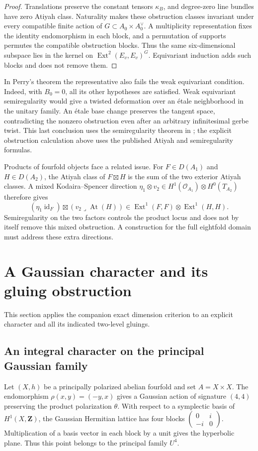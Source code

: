 \documentclass[11pt]{article}
\theoremstyle{definition}
\theoremstyle{remark}
\newcommand{\Z}{\mathbf Z}
\begin{document}
\begin{proof}
Translations preserve the constant tensors $\kappa_B$, and degree-zero line bundles have zero Atiyah class. Naturality makes these obstruction classes invariant under every compatible finite action of $G\subset A_0\times A_0^\vee$. A multiplicity representation fixes the identity endomorphism in each block, and a permutation of supports permutes the compatible obstruction blocks. Thus the same six-dimensional subspace lies in the kernel on $\operatorname{Ext}^2(E_v,E_v)^G$. Equivariant induction adds such blocks and does not remove them.
\end{proof}

In Perry's theorem the representative also fails the weak equivariant condition. Indeed, with $B_0=0$, all its other hypotheses are satisfied. Weak equivariant semiregularity would give a twisted deformation over an \'etale neighborhood in the unitary family. An \'etale base change preserves the tangent space, contradicting the nonzero obstruction even after an arbitrary infinitesimal gerbe twist. This last conclusion uses the semiregularity theorem in \cite{Perry}; the explicit obstruction calculation above uses the published Atiyah and semiregularity formulas.

Products of fourfold objects face a related issue. For $F\in D(A_1)$ and $H\in D(A_2)$, the Atiyah class of $F\boxtimes H$ is the sum of the two exterior Atiyah classes. A mixed Kodaira--Spencer direction $\eta_1\otimes v_2\in H^1(\mathcal O_{A_1})\otimes H^0(T_{A_2})$ therefore gives
\[
 (\eta_1\operatorname{id}_F)\boxtimes
 (v_2\mathbin{\lrcorner}\operatorname{At}(H))
 \in\operatorname{Ext}^1(F,F)\otimes\operatorname{Ext}^1(H,H).
\]
Semiregularity on the two factors controls the product locus and does not by itself remove this mixed obstruction. A construction for the full eightfold domain must address these extra directions.
\section{A Gaussian character and its gluing obstruction}\label{sec:gaussian-character}
This section applies the companion exact dimension criterion to an explicit character and all its indicated two-level gluings.
\subsection{An integral character on the principal Gaussian family}

Let $(X,h)$ be a principally polarized abelian fourfold and set $A=X\times X$. The endomorphism $\rho(x,y)=(-y,x)$ gives a Gaussian action of signature $(4,4)$ preserving the product polarization $\theta$. With respect to a symplectic basis of $H^1(X,\Z)$, the Gaussian Hermitian lattice has four blocks $\left(\begin{smallmatrix}0&i\\-i&0\end{smallmatrix}\right)$. Multiplication of a basis vector in each block by a unit gives the hyperbolic plane. Thus this point belongs to the principal family $U^4$.
\end{document}
